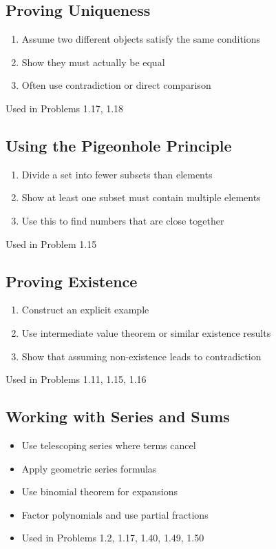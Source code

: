 \subsection*{Proving Uniqueness}
\begin{enumerate}
\item Assume two different objects satisfy the same conditions
\item Show they must actually be equal
\item Often use contradiction or direct comparison
\end{enumerate}
Used in Problems 1.17, 1.18

\subsection*{Using the Pigeonhole Principle}
\begin{enumerate}
\item Divide a set into fewer subsets than elements
\item Show at least one subset must contain multiple elements
\item Use this to find numbers that are close together
\end{enumerate}
Used in Problem 1.15

\subsection*{Proving Existence}
\begin{enumerate}
\item Construct an explicit example
\item Use intermediate value theorem or similar existence results
\item Show that assuming non-existence leads to contradiction
\end{enumerate}
Used in Problems 1.11, 1.15, 1.16

\subsection*{Working with Series and Sums}
\begin{itemize}
\item Use telescoping series where terms cancel
\item Apply geometric series formulas
\item Use binomial theorem for expansions
\item Factor polynomials and use partial fractions
\item Used in Problems 1.2, 1.17, 1.40, 1.49, 1.50
\end{itemize}

